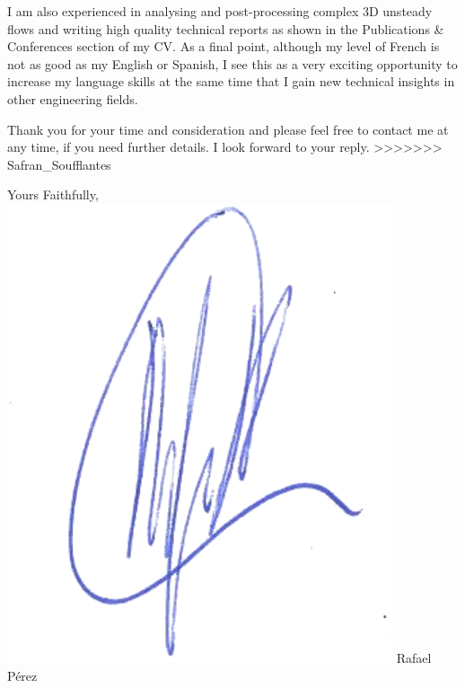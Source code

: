 \documentclass[11pt,stdletter,dateno,sigleft]{newlfm} %
\begin{document}
\begin{newlfm}
I am also experienced in analysing and post-processing complex 3D unsteady flows and writing high quality technical reports as shown in the Publications \& Conferences section of my CV. As a final point, although my level of French is not as good as my English or Spanish, I see this as a very exciting opportunity to increase my language skills at the same time that I gain new technical insights in other engineering fields. 

Thank you for your time and consideration and please feel free to contact me at any time,
if you need further details. I look forward to your reply.
>>>>>>> Safran_Soufflantes

Yours Faithfully, \newline %
\includegraphics[scale=0.7]{sgtrBlue} \newline 
Rafael P\'erez


\end{newlfm}
\end{document}
